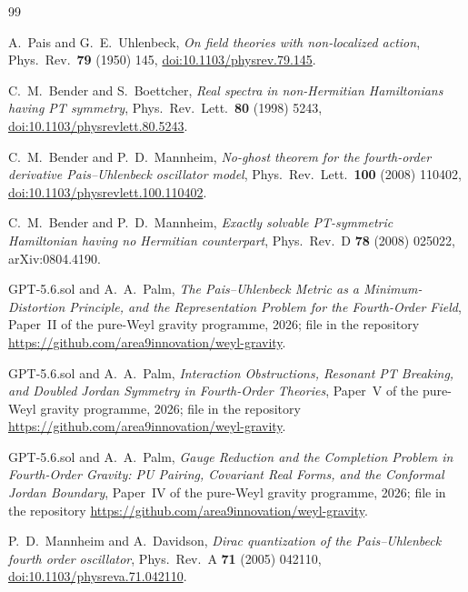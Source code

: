 \documentclass[11pt]{article}
\theoremstyle{definition}
\theoremstyle{remark}
\begin{document}
\begin{thebibliography}{99}

A.~Pais and G.~E.~Uhlenbeck,
\emph{On field theories with non-localized action},
Phys.\ Rev.\ \textbf{79} (1950) 145,
\href{https://doi.org/10.1103/physrev.79.145}{doi:10.1103/physrev.79.145}.

C.~M.~Bender and S.~Boettcher,
\emph{Real spectra in non-Hermitian Hamiltonians having PT symmetry},
Phys.\ Rev.\ Lett.\ \textbf{80} (1998) 5243,
\href{https://doi.org/10.1103/physrevlett.80.5243}{doi:10.1103/physrevlett.80.5243}.

C.~M.~Bender and P.~D.~Mannheim,
\emph{No-ghost theorem for the fourth-order derivative Pais--Uhlenbeck
oscillator model},
Phys.\ Rev.\ Lett.\ \textbf{100} (2008) 110402,
\href{https://doi.org/10.1103/physrevlett.100.110402}{doi:10.1103/physrevlett.100.110402}.

C.~M.~Bender and P.~D.~Mannheim,
\emph{Exactly solvable PT-symmetric Hamiltonian having no Hermitian
counterpart},
Phys.\ Rev.\ D \textbf{78} (2008) 025022, arXiv:0804.4190.

GPT-5.6.sol and A.~A.~Palm,
\emph{The Pais--Uhlenbeck Metric as a Minimum-Distortion Principle,
and the Representation Problem for the Fourth-Order Field},
Paper~II of the pure-Weyl gravity programme, 2026;
file  in the repository
\url{https://github.com/area9innovation/weyl-gravity}.

GPT-5.6.sol and A.~A.~Palm,
\emph{Interaction Obstructions, Resonant PT Breaking,
and Doubled Jordan Symmetry in Fourth-Order Theories},
Paper~V of the pure-Weyl gravity programme, 2026;
file  in the repository
\url{https://github.com/area9innovation/weyl-gravity}.

GPT-5.6.sol and A.~A.~Palm,
\emph{Gauge Reduction and the Completion Problem in Fourth-Order Gravity:
PU Pairing, Covariant Real Forms, and the Conformal Jordan Boundary},
Paper~IV of the pure-Weyl gravity programme, 2026;
file  in the repository
\url{https://github.com/area9innovation/weyl-gravity}.

P.~D.~Mannheim and A.~Davidson,
\emph{Dirac quantization of the Pais--Uhlenbeck fourth order oscillator},
Phys.\ Rev.\ A \textbf{71} (2005) 042110,
\href{https://doi.org/10.1103/physreva.71.042110}{doi:10.1103/physreva.71.042110}.


\end{thebibliography}
\end{document}
